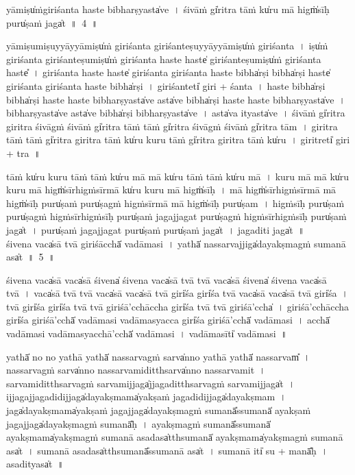 \documentclass[parskip, DIV=14]{scrartcl}
\begin{document}
{\vspace{0.5cm}
yāmiṣu̍ṁgiriśanta॒ haste॒ bibha॒rṣyasta̍ve~।
śi॒vāṁ gi̍ritra॒ tāṁ ku̍ru॒ mā higṁ̍sī॒ḥ puru̍ṣa॒ṁ jaga̍t~॥~4~॥

yāmiṣu॒miṣu॒yyāyyāmiṣu̍ṁ giriśanta giriśa॒nteṣu॒yyāyyāmiṣu̍ṁ giriśanta~।  %
iṣu̍ṁ giriśanta giriśa॒nteṣu॒miṣu̍ṁ giriśanta॒ haste॒ haste̍ giriśa॒nteṣu॒miṣu̍ṁ giriśanta॒ haste̎~।
gi॒ri॒śa॒nta॒ haste॒ haste̍ giriśanta giriśanta॒ haste॒ bibha̍rṣi॒ bibha̍rṣi॒ haste̍ giriśanta giriśanta॒ haste॒ bibha̍rṣi~।
gi॒ri॒śa॒nteti̍ giri + śa॒nta॒~।
haste॒ bibha̍rṣi॒ bibha̍rṣi॒ haste॒ haste॒ bibha॒rṣyasta̍ve॒ asta̍ve॒ bibha̍rṣi॒ haste॒ haste॒ bibha॒rṣyasta̍ve~।
bibha॒rṣyasta̍ve॒ asta̍ve॒ bibha̍rṣi॒ bibha॒rṣyasta̍ve~।
asta̍va॒  ityasta̍ve~।
śi॒vāṁ gi̍ritra giritra śi॒vāgṁ śi॒vāṁ gi̍ritra॒ tāṁ tāṁ gi̍ritra śi॒vāgṁ śi॒vāṁ gi̍ritra॒ tām~। %
gi॒ri॒tra॒ tāṁ tāṁ gi̍ritra giritra॒ tāṁ ku̍ru kuru॒ tāṁ gi̍ritra giritra॒ tāṁ ku̍ru~। %
gi॒ri॒treti̍ giri + tra॒~॥

tāṁ ku̍ru kuru॒ tāṁ tāṁ ku̍ru॒ mā mā ku̍ru॒ tāṁ tāṁ ku̍ru॒ mā~। %
ku॒ru॒ mā mā ku̍ru kuru॒ mā higṁ̍sīrhigṁsī॒rmā ku̍ru kuru॒ mā higṁ̍sīḥ~। %
mā higṁ̍sīrhigṁsī॒rmā mā higṁ̍sī॒ḥ puru̍ṣa॒ṁ puru̍ṣagṁ higṁsī॒rmā mā higṁ̍sī॒ḥ puru̍ṣam~।
hi॒gṁ॒sī॒ḥ puru̍ṣa॒ṁ puru̍ṣagṁ higṁsīrhigṁsī॒ḥ puru̍ṣa॒ṁ jaga॒jjaga॒t puru̍ṣagṁ higṁsīrhigṁsī॒ḥ puru̍ṣa॒ṁ jaga̍t~।
puru̍ṣa॒ṁ jaga॒jjaga॒t puru̍ṣa॒ṁ puru̍ṣa॒ṁ jaga̍t~।
jaga॒diti॒ jaga̍t~॥\\ 

\vspace{0.5cm}
śi॒vena॒ vaca̍sā tvā॒ giri॒śācchā̍ vadāmasi~।
yathā̍ na॒ssarva॒jjiga̍daya॒kṣmagṁ su॒manā॒ asa̍t~॥~5~॥

śi॒vena॒ vaca̍sā॒ vaca̍sā śi॒vena̍ śi॒vena॒ vaca̍sā tvā tvā॒ vaca̍sā śi॒vena̍ śi॒vena॒ vaca̍sā tvā~।
vaca̍sā tvā tvā॒ vaca̍sā॒ vaca̍sā tvā॒ giri̍śa॒ giri̍śa tvā॒ vaca̍sā॒ vaca̍sā tvā॒ giri̍śa~।
tvā॒ giri̍śa॒ giri̍śa tvā tvā॒ giri॒śā'cchāccha॒ giri̍śa tvā tvā॒ giri॒śā'ccha̍~।
giri॒śā'cchāccha॒ giri̍śa॒ giri॒śā'cchā̍ vadāmasi vadāma॒syacca॒ giri̍śa॒ giri॒śā'cchā̍ vadāmasi~।
acchā̍ vadāmasi vadāma॒syacchā'cchā̍ vadāmasi~।
va॒dā॒ma॒sīti̍  vadāmasi~॥

yathā̍ no no॒ yathā॒ yathā̍ na॒ssarva॒gṁ॒ sarva̍nno॒ yathā॒ yathā̍ na॒ssarvam̎~।
na॒ssarva॒gṁ॒ sarva̍nno na॒ssarva॒miditthsarva̍nno na॒ssarvamit~। %
sarva॒miditthsarva॒gṁ॒ sarva॒mijjaga̍jjaga॒ditthsarva॒gṁ॒ sarva॒mijjaga̍t~। %
ijjaga॒jjaga॒didijjaga̍daya॒kṣmama̍ya॒kṣaṁ jaga॒didijjaga̍daya॒kṣmam~। %
jaga̍daya॒kṣmama̍ya॒kṣaṁ jaga॒jjaga̍daya॒kṣmagṁ su॒manā̎ssu॒manā̍ aya॒kṣaṁ jaga॒jjaga̍daya॒kṣmagṁ su॒manā̎ḥ~।
a॒ya॒kṣmagṁ su॒manā̎ssu॒manā̍ aya॒kṣmama̍ya॒kṣmagṁ su॒manā॒ asa॒dasa̍tthsu॒manā̍ aya॒kṣmama̍ya॒kṣmagṁ su॒manā॒ asa̍t~।
su॒manā॒ asa॒dasa̍tthsu॒manā̎ssu॒manā॒ asa̍t~। %
su॒manā॒ iti̍ su + manā̎ḥ~।
asa॒dityasa̍t~॥\\ 

}
\end{document}
